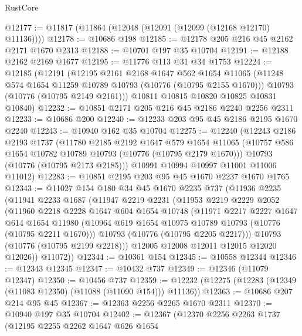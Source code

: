 \begin{lexlean}{RustCore}
\begin{coremodule}
@12177 := @11817 (@11864 (@12048 (@12091 (@12099 (@12168 @12170) @11136))))
@12178 := @10686 @198
@12185 := @12178 @205 @216 @45 @2162 @2171 @1670 @2313
@12188 := @10701 @197 @35 @10704
@12191 := @12188 @2162 @2169 @1677
@12195 := @11776 @113 @31 @34 @1753
@12224 := @12185
    (@12191
      (@12195
        @2161
        @2168
        @1647
        @562
        @1654
        @11065
        (@11248 @574 @1654 @11259 @10789 @10793 (@10776 (@10795 @2155 @1670)))
        @10793
        (@10776 (@10795 @2149 @2161)))
      @10811
      @10815
      @10820
      @10825
      @10831
      @10840)
@12232 := @10851 @2171 @205 @216 @45 @2186 @2240 @2256 @2311
@12233 := @10686 @200
@12240 := @12233 @203 @95 @45 @2186 @2195 @1670 @2240
@12243 := @10940 @162 @35 @10704
@12275 := @12240
    (@12243
      @2186
      @2193
      @1737
      (@11780
        @2185
        @2192
        @1647
        @579
        @1654
        @11065
        (@10757 @586 @1654 @10782 @10789 @10793 (@10776 (@10795 @2179 @1670)))
        @10793
        (@10776 (@10795 @2173 @2185)))
      @10991
      @10994
      @10997
      @11001
      @11006
      @11012)
@12283 := @10851 @2195 @203 @95 @45 @1670 @2237 @1670 @1765
@12343 := @11027
    @154
    @180
    @34
    @45
    @1670
    @2235
    @737
    (@11936
      @2235
      (@11941
        @2233
        @1687
        (@11947
          @2219
          @2231
          (@11953
            @2219
            @2229
            @2052
            (@11960
              @2218
              @2228
              @1647
              @604
              @1654
              @10748
              (@11971
                @2217
                @2227
                @1647
                @614
                @1654
                @11980
                (@10964 @619 @1654 @10975 @10789 @10793 (@10776 (@10795 @2211 @1670)))
                @10793
                (@10776 (@10795 @2205 @2217)))
              @10793
              (@10776 (@10795 @2199 @2218)))
            @12005
            @12008
            @12011
            @12015
            @12020
            @12026))
        @11072))
@12344 := @10361 @154
@12345 := @10558 @12344
@12346 := @12343 @12345
@12347 := @10432 @737
@12349 := @12346 (@11079 @12347)
@12350 := @10456 @737
@12359 := @12232 (@12275 (@12283 (@12349 (@11083 @12350) (@11088 (@11090 @154))) @11136))
@12363 := @10686 @207 @214 @95 @45
@12367 := @12363 @2256 @2265 @1670 @2311
@12370 := @10940 @197 @35 @10704
@12402 := @12367
    (@12370
      @2256
      @2263
      @1737
      (@12195
        @2255
        @2262
        @1647
        @626
        @1654

\end{coremodule}
\end{lexlean}
